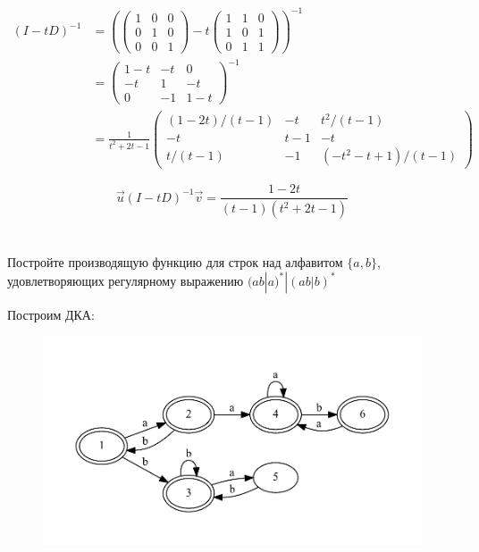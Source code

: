 \begin{align*}
    (I - tD)^{ - 1} & = \left( \begin{pmatrix} 1 & 0 & 0 \\ 0 & 1 & 0 \\ 0 & 0 & 1 \end{pmatrix} - t \begin{pmatrix}
        1 & 1 & 0 \\
        1 & 0 & 1 \\
        0 & 1 & 1
    \end{pmatrix} \right)^{ - 1} \\
                    & = \begin{pmatrix} 1 - t & - t & 0 \\ - t & 1 & - t \\ 0 & - 1 & 1 - t \end{pmatrix}^{ - 1}                                               \\
                    & = \frac{1}{t^2 + 2 t - 1} \begin{pmatrix}
        (1 - 2 t)/(t - 1) & -t    & t^2/(t - 1)            \\
        -t                & t - 1 & -t                     \\
        t/(t - 1)         & -1    & (-t^2 - t + 1)/(t - 1)
    \end{pmatrix}
\end{align*}

\[\vec{u} (I - tD)^{ - 1} \vec{v} = \frac{1 - 2t}{(t - 1)(t^2 + 2t - 1)}\]

\section{}
Постройте производящую функцию для строк над алфавитом $\{a, b\}$, удовлетворяющих регулярному выражению $(ab|a)^* | (ab|b)^*$

Построим ДКА:
\begin{figure}[h]
    \includegraphics[scale=0.7]{images/75.pdf}
\end{figure}

